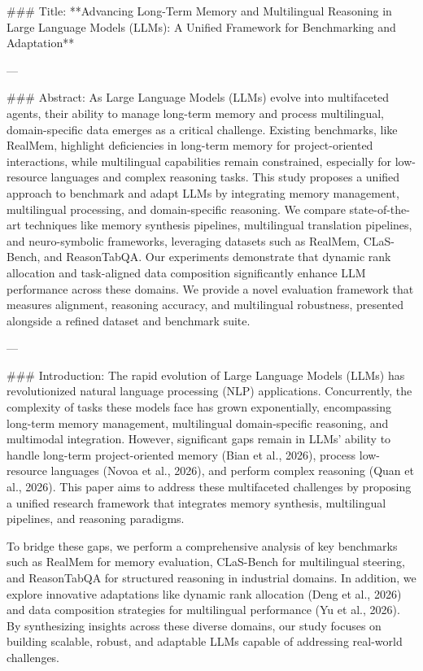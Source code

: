 ### Title:
**Advancing Long-Term Memory and Multilingual Reasoning in Large Language Models (LLMs): A Unified Framework for Benchmarking and Adaptation**

---

### Abstract:
As Large Language Models (LLMs) evolve into multifaceted agents, their ability to manage long-term memory and process multilingual, domain-specific data emerges as a critical challenge. Existing benchmarks, like RealMem, highlight deficiencies in long-term memory for project-oriented interactions, while multilingual capabilities remain constrained, especially for low-resource languages and complex reasoning tasks. This study proposes a unified approach to benchmark and adapt LLMs by integrating memory management, multilingual processing, and domain-specific reasoning. We compare state-of-the-art techniques like memory synthesis pipelines, multilingual translation pipelines, and neuro-symbolic frameworks, leveraging datasets such as RealMem, CLaS-Bench, and ReasonTabQA. Our experiments demonstrate that dynamic rank allocation and task-aligned data composition significantly enhance LLM performance across these domains. We provide a novel evaluation framework that measures alignment, reasoning accuracy, and multilingual robustness, presented alongside a refined dataset and benchmark suite.

---

### Introduction:
The rapid evolution of Large Language Models (LLMs) has revolutionized natural language processing (NLP) applications. Concurrently, the complexity of tasks these models face has grown exponentially, encompassing long-term memory management, multilingual domain-specific reasoning, and multimodal integration. However, significant gaps remain in LLMs' ability to handle long-term project-oriented memory (Bian et al., 2026), process low-resource languages (Novoa et al., 2026), and perform complex reasoning (Quan et al., 2026). This paper aims to address these multifaceted challenges by proposing a unified research framework that integrates memory synthesis, multilingual pipelines, and reasoning paradigms.

To bridge these gaps, we perform a comprehensive analysis of key benchmarks such as RealMem for memory evaluation, CLaS-Bench for multilingual steering, and ReasonTabQA for structured reasoning in industrial domains. In addition, we explore innovative adaptations like dynamic rank allocation (Deng et al., 2026) and data composition strategies for multilingual performance (Yu et al., 2026). By synthesizing insights across these diverse domains, our study focuses on building scalable, robust, and adaptable LLMs capable of addressing real-world challenges.

